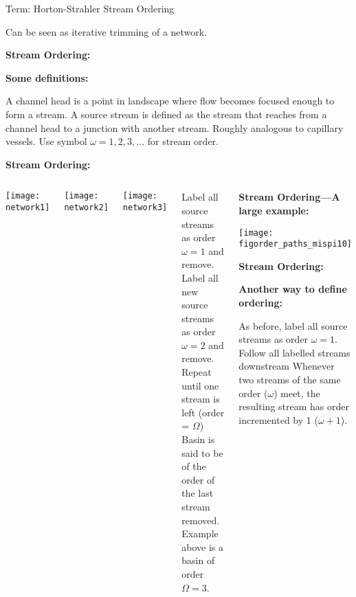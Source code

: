 \begin{frame}[label=]
\begin{frame}[label=]
\begin{frame}[label=]
\begin{frame}[label=]
\begin{frame}[label=]
\begin{frame}[label=]
\begin{frame}[label=]
\begin{frame}[label=]
\begin{frame}[label=]
\begin{frame}[label=]
\begin{frame}[label=]
\begin{frame}[label=]
      Term: Horton-Strahler Stream Ordering\cite{rodriguez-iturbe1997a}
    
      Can be seen as \alert{iterative trimming} of a network.
    
  


\begin{frame}[label=]
  \textbf{Stream Ordering:}

  \textbf{Some definitions:}
    
     A \alert{channel head} is a point in landscape
      where flow becomes focused enough to form a stream.
     A \alert{source stream} is defined as the 
      stream that reaches from a channel head
      to a junction with another stream.
     Roughly analogous to capillary vessels.
     Use symbol $\omega=1, 2, 3, ...$ for stream order.
    
    
  


\begin{frame}[label=]
  \textbf{Stream Ordering:}

  \begin{columns}[b]
    
    
    \texttt{[image: network1]}
    
    
    \texttt{[image: network2]}
    
    
    \texttt{[image: network3]}
    
    
    Label all \alert{source streams} as \alert{order $\omega=1$} and remove.
    Label all \alert{new} source streams as \alert{order $\omega=2$} and remove.
    Repeat until one stream is left (order = $\Omega$)
    Basin is said to be of the order of the last stream removed.
    Example above is a basin of order $\Omega=3$.
  


\begin{frame}[label=]
  \textbf{Stream Ordering---A large example:}

  \begin{center}
    \texttt{[image: figorder\_paths\_mispi10]}  
  \end{center}


\begin{frame}[label=]
  \textbf{Stream Ordering:}
  
  \textbf{Another way to define ordering:}
    
     As before, label all \alert{source streams} as \alert{order $\omega=1$}.
     Follow all labelled streams downstream
     Whenever two streams of the same order ($\omega$) meet, the resulting stream
      has order incremented by 1 ($\omega+1$).
    

\end{frame}
\end{frame}
\end{columns}
\end{frame}
\end{frame}
\end{frame}
\end{frame}
\end{frame}
\end{frame}
\end{frame}
\end{frame}
\end{frame}
\end{frame}
\end{frame}
\end{frame}
\end{frame}
\end{frame}
